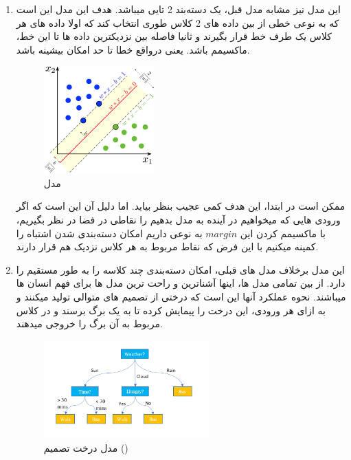 \begin{enumerate}
		
	\item 
	
	این مدل نیز مشابه مدل قبل، یک دسته‌بند 2 تایی میباشد. هدف این مدل این است که به نوعی خطی از بین داده های 2 کلاس طوری انتخاب کند که اولا داده های هر کلاس یک طرف خط قرار بگیرند و ثانیا فاصله بین نزدیکترین داده ها تا این خط، ماکسیمم باشد. یعنی درواقع  خطا تا حد امکان بیشینه باشد. 
	
	\begin{figure}[h]
		\centering
		\includegraphics[width=0.4\textwidth]{training/3}
		\caption{مدل }
		\label{fig:training:svm}
	\end{figure}

	ممکن است در ابتدا، این هدف کمی عجیب بنظر بیاید. اما دلیل آن این است که اگر ورودی هایی که میخواهیم در آینده به مدل بدهیم را نقاطی در فضا در نظر بگیریم، با ماکسیمم کردن این $margin$ به نوعی داریم امکان دسته‌بندی شدن اشتباه را کمینه میکنیم با این فرض که نقاط مربوط به هر کلاس نزدیک هم قرار دارند. 
	
	
	
	\item 
	
	این مدل برخلاف مدل های قبلی، امکان دسته‌بندی چند کلاسه را به طور مستقیم را دارد. از بین تمامی مدل ها، اینها آشناترین و راحت ترین مدل ها برای فهم انسان ها میباشند. نحوه عملکرد آنها این است که درختی از تصمیم های متوالی تولید میکنند و به ازای هر ورودی، این درخت را پیمایش کرده تا به یک برگ برسند و در کلاس مربوط به آن برگ را خروجی میدهند. 
	
	\begin{figure}[h]
		\centering
		\includegraphics[width=0.6\textwidth]{training/4}
		\caption{مدل درخت تصمیم ()}
		\label{fig:training:decision-tree}
	\end{figure}
	

\end{enumerate}
